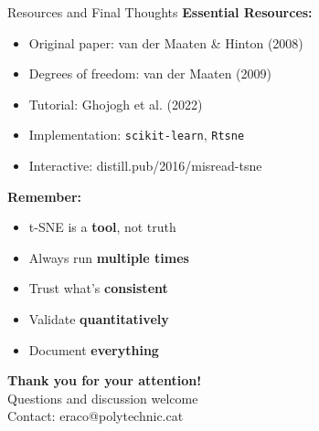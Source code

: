 \documentclass[aspectratio=169]{beamer}
\begin{document}
\begin{frame}{Resources and Final Thoughts}
\textbf{Essential Resources:}
\begin{itemize}
\item Original paper: van der Maaten \& Hinton (2008)
\item Degrees of freedom: van der Maaten (2009)
\item Tutorial: Ghojogh et al. (2022)
\item Implementation: \texttt{scikit-learn}, \texttt{Rtsne}
\item Interactive: distill.pub/2016/misread-tsne
\end{itemize}

\textbf{Remember:}
\begin{itemize}
\item t-SNE is a \textbf{tool}, not truth
\item Always run \textbf{multiple times}
\item Trust what's \textbf{consistent}
\item Validate \textbf{quantitatively}
\item Document \textbf{everything}
\end{itemize}

\vspace{0.5cm}
\begin{center}
\Large\textbf{Thank you for your attention!}\\[0.3cm]
\normalsize Questions and discussion welcome\\[0.2cm]
\small Contact: eraco@polytechnic.cat
\end{center}
\end{frame}
\end{document}
